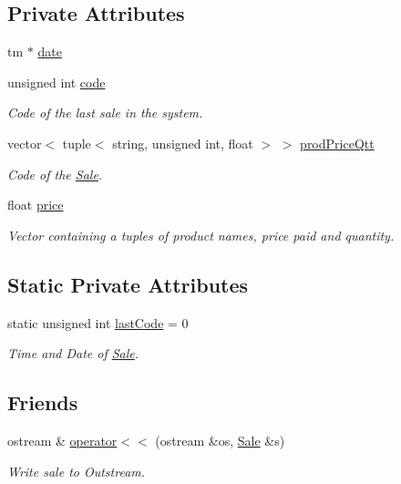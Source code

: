 \subsection*{Private Attributes}
\begin{DoxyCompactItemize}
\item 
tm $\ast$ \hyperlink{classSale_a953e40805ef7b401caa1fc356c23772c}{date}
\item 
unsigned int \hyperlink{classSale_ad86ea33bedf6450d06a90442eca79053}{code}
\begin{DoxyCompactList}\small\item\em Code of the last sale in the system. \end{DoxyCompactList}\item 
vector$<$ tuple$<$ string, unsigned int, float $>$ $>$ \hyperlink{classSale_a968a0a80a79f28b918509af6f9c93821}{prod\+Price\+Qtt}
\begin{DoxyCompactList}\small\item\em Code of the \hyperlink{classSale}{Sale}. \end{DoxyCompactList}\item 
float \hyperlink{classSale_a7fcb726755f9a802c21c1ecef5fc5753}{price}
\begin{DoxyCompactList}\small\item\em Vector containing a tuples of product names, price paid and quantity. \end{DoxyCompactList}\end{DoxyCompactItemize}
\subsection*{Static Private Attributes}
\begin{DoxyCompactItemize}
\item 
static unsigned int \hyperlink{classSale_aeebd444e8f864bd91a90e6d426dabc70}{last\+Code} = 0
\begin{DoxyCompactList}\small\item\em Time and Date of \hyperlink{classSale}{Sale}. \end{DoxyCompactList}\end{DoxyCompactItemize}
\subsection*{Friends}
\begin{DoxyCompactItemize}
\item 
ostream \& \hyperlink{classSale_a3dc1c9b3c685b4a1d9553083be9c3fbf}{operator$<$$<$} (ostream \&os, \hyperlink{classSale}{Sale} \&s)
\begin{DoxyCompactList}\small\item\em Write sale to Outstream. \end{DoxyCompactList}\end{DoxyCompactItemize}


